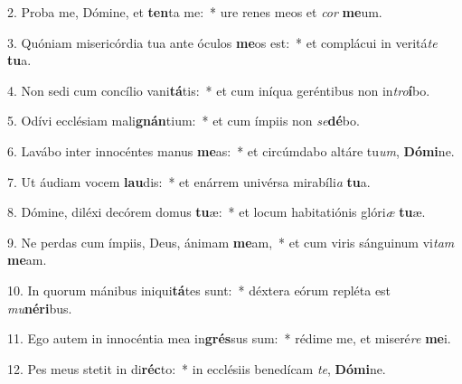 2. Proba me, Dómine, et \textbf{ten}ta me:~*  ure renes meos et \textit{cor} \textbf{me}um.\

3. Quóniam misericórdia tua ante óculos \textbf{me}os est:~*  et complácui in veritá\textit{te} \textbf{tu}a.\

4. Non sedi cum concílio vani\textbf{tá}tis:~*  et cum iníqua geréntibus non in\textit{tro}\textbf{í}bo.\

5. Odívi ecclésiam mali\textbf{gnán}tium:~*  et cum ímpiis non \textit{se}\textbf{dé}bo.\

6. Lavábo inter innocéntes manus \textbf{me}as:~*  et circúmdabo altáre tu\textit{um}, \textbf{Dó}\textbf{mi}ne.\

7. Ut áudiam vocem \textbf{lau}dis:~*  et enárrem univérsa mirabíli\textit{a} \textbf{tu}a.\

8. Dómine, diléxi decórem domus \textbf{tu}æ:~*  et locum habitatiónis glóri\textit{æ} \textbf{tu}æ.\

9. Ne perdas cum ímpiis, Deus, ánimam \textbf{me}am,~*  et cum viris sánguinum vi\textit{tam} \textbf{me}am.\

10. In quorum mánibus iniqui\textbf{tá}tes sunt:~*  déxtera eórum repléta est \textit{mu}\textbf{né}\textbf{ri}bus.\

11. Ego autem in innocéntia mea in\textbf{grés}sus sum:~*  rédime me, et miseré\textit{re} \textbf{me}i.\

12. Pes meus stetit in di\textbf{réc}to:~*  in ecclésiis benedícam \textit{te}, \textbf{Dó}\textbf{mi}ne.\

